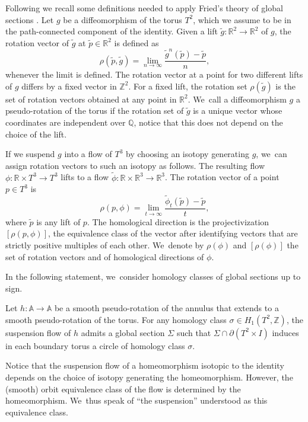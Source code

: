 Following \cite{K1} we recall some definitions needed to apply Fried's theory of global sections \cite{Fr}. Let $g$ be a diffeomorphism of the torus $T^2$, which we assume to be in the path-connected component of the identity. Given a lift $\widetilde g:\mathbb{R}^2 \rightarrow \mathbb{R}^2$ of $g$, the rotation vector of $\widetilde g$ at $\widetilde p \in \mathbb{R}^2$ is defined as
\[
\rho(\widetilde p, \widetilde g)=\lim_{n\rightarrow \infty} \frac{\widetilde g^n(\widetilde p)-\widetilde p}{n},
\]
whenever the limit is defined. The rotation vector at a point for two different lifts of $g$ differs by a fixed vector in $\mathbb{Z}^2$. For a fixed lift, the rotation set $\rho(\widetilde g)$ is the set of rotation vectors obtained at any point in $\mathbb{R}^2$. We~call a diffeomorphism $g$ a pseudo-rotation of the torus if the rotation set of $\widetilde g$ is a unique vector whose coordinates are independent over $\mathbb{Q}$, notice that this does not depend on the choice of the lift.

If we suspend $g$ into a flow of $T^3$ by choosing an isotopy generating $g$, we~can assign rotation vectors to such an isotopy as follows. The resulting flow $\phi: \mathbb{R}\times T^3\rightarrow T^3$ lifts to a flow $\widetilde \phi: \mathbb{R}\times \mathbb{R}^3\rightarrow \mathbb{R}^3$. The rotation vector of a point $p\in T^3$ is
\[
\rho(p,\phi)=\lim_{t\rightarrow \infty}\frac{\widetilde \phi_t(\widetilde p)-\widetilde p}{t},
\]
where $\widetilde p$ is any lift of $p$. The homological direction is the projectivization $[\rho(p,\phi)]$, \ie the equivalence class of the vector after identifying vectors that are strictly positive multiples of each other. We~denote by $\rho(\phi)$ and $[\rho(\phi)]$ the set of rotation vectors and of homological directions of $\phi$.

In the following statement, we~consider homology classes of global sections up to sign.
\begin{prop}\label{prop:sections}
Let $h: \mathbb{A} \rightarrow \mathbb{A}$ be a smooth pseudo-rotation of the annulus that extends to a smooth pseudo-rotation of the torus. For any homology class $\sigma\in H_1(T^2,\mathbb{Z})$, the suspension flow of $h$ admits a global section $\Sigma$ such that $ \Sigma \cap \partial (T^2\times I)$ induces in each boundary torus a circle of homology class $\sigma$.
\end{prop}

Notice that the suspension flow of a homeomorphism isotopic to the identity depends on the choice of isotopy generating the homeomorphism. However, the (smooth) orbit equivalence class of the flow is determined by the homeomorphism. We~thus speak of ``the suspension'' understood as this equivalence class.

